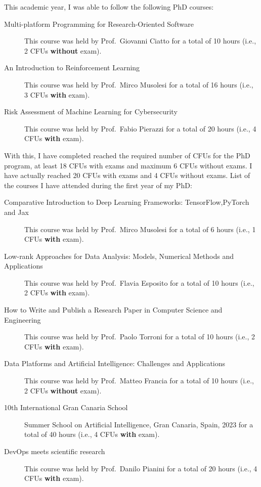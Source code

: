 \documentclass[
]{ceurart}
\begin{document}
This academic year, I was able to follow the following PhD courses:
\begin{description}
    \item[Multi-platform Programming for Research-Oriented Software] This course was held by Prof.~Giovanni Ciatto for a total of 10 hours (i.e., 2 CFUs \textbf{without} exam).
    \item[An Introduction to Reinforcement Learning] This course was held by Prof.~Mirco Musolesi for a total of 16 hours (i.e., 3 CFUs \textbf{with} exam).
    \item[Risk Assessment of Machine Learning for Cybersecurity] This course was held by Prof.~Fabio Pierazzi for a total of 20 hours (i.e., 4 CFUs \textbf{with} exam).
\end{description}

With this, I have completed reached the required number of CFUs for the PhD program, at least 18 CFUs with exams and maximum 6 CFUs without exams.
%
I have actually reached 20 CFUs with exams and 4 CFUs without exams.
%
List of the courses I have attended during the first year of my PhD:
%
\begin{description}
    \item[Comparative Introduction to Deep Learning Frameworks: TensorFlow,PyTorch and Jax] This course was held by Prof.~Mirco Musolesi for a total of 6 hours (i.e., 1 CFUs \textbf{with} exam).
    \item[Low-rank Approaches for Data Analysis: Models, Numerical Methods and Applications] This course was held by Prof.~Flavia Esposito for a total of 10 hours (i.e., 2 CFUs \textbf{with} exam).
    \item[How to Write and Publish a Research Paper in Computer Science and Engineering] This course was held by Prof.~Paolo Torroni for a total of 10 hours (i.e., 2 CFUs \textbf{with} exam).
    \item[Data Platforms and Artificial Intelligence: Challenges and Applications] This course was held by Prof.~Matteo Francia for a total of 10 hours (i.e., 2 CFUs \textbf{without} exam).
    \item[10th International Gran Canaria School] Summer School on Artificial Intelligence, Gran Canaria, Spain, 2023 for a total of 40 hours (i.e., 4 CFUs \textbf{with} exam).
    \item[DevOps meets scientific research] This course was held by Prof.~Danilo Pianini for a total of 20 hours (i.e., 4 CFUs \textbf{with} exam).
\end{description}


\end{document}
